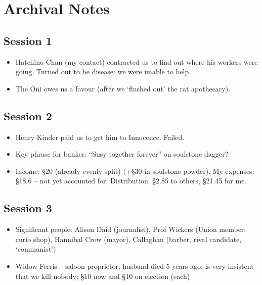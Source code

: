 \documentclass[10pt,a4paper]{article}
\begin{document}
\begin{minipage}[t]{\textwidth}

\section*{Archival Notes}

\subsection*{Session 1}

	\begin{itemize}
	  \item Hatchino Chan (my contact) contracted us to find out where his workers were going. Turned out to be disease: we were unable to help.
	  \item The Oni owes us a favour (after we `flushed out' the rat apothecary).
	\end{itemize}
	
\subsection*{Session 2} 

  \begin{itemize}
    \item Henry Kinder paid us to get him to Innocence. Failed.
    \item Key phrase for banker: ``Susy together forever'' on soulstone dagger?
    \item Income: §20 (already evenly split) (+§30 in soulstone powder). My expenses: §18.6 -- not yet accounted for. Distribution: §2.85 to others, §21.45 for me.
  \end{itemize}
  
\subsection*{Session 3}

  \begin{itemize}
    \item Significant people: Alison Daid (journalist), Prof Wickers (Union member; curio shop), Hannibal Crow (mayor), Callaghan (barber, rival candidate, `communist')
    \item Widow Ferris -- saloon proprietor; husband died 5 years ago; is very insistent that we kill nobody; §10 now and §10 on election (each)
  \end{itemize}
  

\end{minipage}
\end{document}
